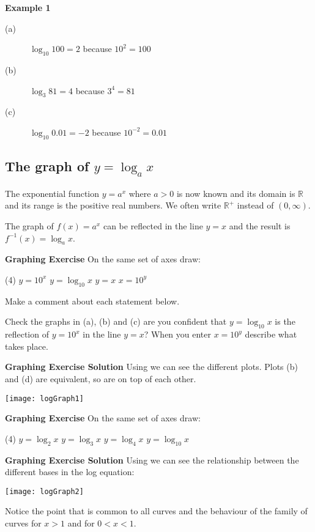 \textbf{Example 1}
\begin{description}
	\item [(a)] $\log _{10} 100 =2$ because $10^{2} =100$ 
	
	\item [(b)] $\log _{3} 81 =4$ because $3^{4} =81$ 
	
	\item [(c)] $\log _{10} 0.01 = -2$ because $10^{ -2} =0.01$ \end{description}

\subsection*{The graph of $y =\log _{a} x$}
The exponential function $y =a^{x}$ where $a >0$ is now known and its domain is $\mathbb{R}$ and its range is the positive real numbers. We often
write $\mathbb{R}^{ +}$ instead of $\left (0 ,\infty \right )$. 

The graph of $f (x) =a^{x}$ can be reflected in the line $y =x$ and the result is $f^{ -1} (x) =\log _{a} x$. 

\textbf{Graphing Exercise} On the same set of axes draw:
\begin{tasks}(4)
	\task $y =10^{x}$ 
	\task $y =\log _{10} x$ 
	\task $y =x$ 
	\task $x =10^{y}$ 
\end{tasks}

Make a comment about each statement below. 
\begin{tasks}
	\task[1.] Check the graphs in (a), (b) and (c) are you confident that $y =\log _{10} x$ is the reflection of $y =10^{x}$ in the line $y =x$?
	\task[2.] When you enter $x =10^{y}$ describe what takes place.
	\end{tasks}

\textbf{Graphing Exercise Solution} Using \desmos we can see the different plots. Plots (b) and (d) are equivalent, so are on top of each other.\\
\begin{center}
\texttt{[image: logGraph1]}\\
\end{center}

\textbf{Graphing Exercise} On the same set of axes draw:
\begin{tasks}(4)
	\task $y =\log _{2} x$ 
	\task $y =\log _{3} x$ 
	\task $y =\log _{4} x$ 
	\task $y =\log _{10} x$ \end{tasks}
\textbf{Graphing Exercise Solution} Using \desmos we can see the relationship between the different bases in the log equation:\\
\begin{center}\texttt{[image: logGraph2]}\end{center}
Notice the point that is common to all curves and the behaviour of the family of curves for $x >1$ and for $0 <x <1$. 

